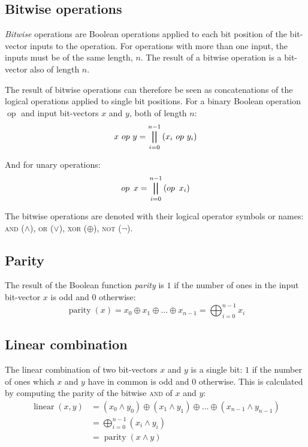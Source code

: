 \documentclass[a4paper,10pt,twoside,openright]{book}
\renewcommand{\sc}[1]{\textsc{\lowercase{#1}}}
\DeclareMathOperator{\parity}{parity}
\DeclareMathOperator{\lin}{linear}
\begin{document}
\subsection{Bitwise operations}
\textit{Bitwise} operations are Boolean operations applied to each bit position of the bit-vector inputs to the operation. For operations with more than one input, the inputs must be of the same length, $n$. The result of a bitwise operation is a bit-vector also of length $n$.

The result of bitwise operations can therefore be seen as concatenations of the logical operations applied to single bit positions. For a binary Boolean operation $\mathop{op}$ and input bit-vectors $x$ and $y$, both of length $n$: 
\[x\,\mathop{op}\,y = \bigparallel_{i=0}^{n-1}\left(x_i\,\mathop{op}\,y_i\right)\]

And for unary operations:
\[\mathop{op}~x = \bigparallel_{i=0}^{n-1}\left(\mathop{op}~x_i\right)\]

The bitwise operations are denoted with their logical operator symbols or names: \sc{AND} ($\land$), \sc{OR} ($\lor$), \sc{XOR} ($\oplus$), \sc{NOT} ($\lnot$).

\subsection{Parity}
The result of the Boolean function \textit{parity} is $1$ if the number of ones in the input bit-vector $x$ is odd and $0$ otherwise: \[\parity(x) = x_0 \oplus x_1 \oplus \ldots \oplus x_{n-1} = \bigoplus_{i=0}^{n-1}x_i\]

\subsection{Linear combination}
\label{sec:linear}
The linear combination of two bit-vectors $x$ and $y$ is a single bit:
$1$ if the number of ones which $x$ and $y$ have in common is odd and $0$ otherwise.
This is calculated by computing the parity of the bitwise \sc{AND} of $x$ and $y$:
\[
\begin{aligned}
\lin\left(x,y\right) &= \left(x_0 \land y_0\right) \oplus \left(x_1 \land y_1\right) \oplus \ldots \oplus \left(x_{n-1} \land y_{n-1}\right) \\
 & = \bigoplus_{i=0}^{n-1}\left(x_i \land y_i\right) \\
 & = \parity\left(x \land y\right)
\end{aligned}
\]
\end{document}
